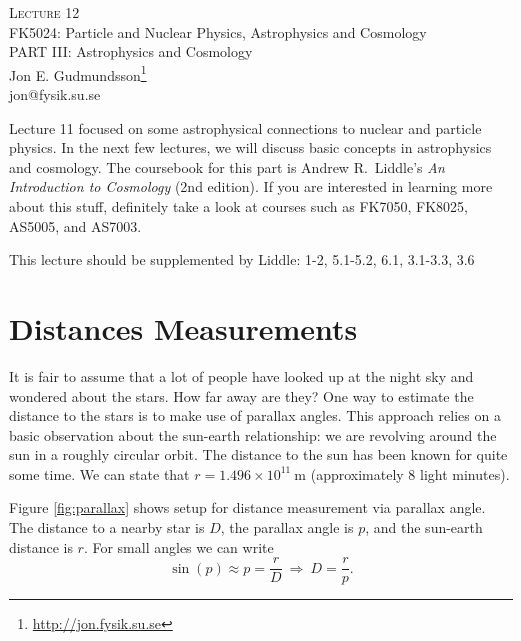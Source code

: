 \documentclass[a4paper,12pt]{article}
\theoremstyle{remark}
\newcommand{\mrm}[1]{\mathrm{#1}}
\renewcommand{\=}[1]{\stackrel{#1}{=}} %
\newcommand{\linkc}[1]{\textcolor{linkc}{#1}}
\theoremstyle{plain}
\theoremstyle{definition}
\begin{document}
\fontsize{5mm}{6mm}\selectfont\thispagestyle{empty}

\thispagestyle{empty}
\begin{center}
\textsc{Lecture 12}\\[1.5ex]
{\Huge FK5024: Particle and Nuclear Physics, Astrophysics and Cosmology\\}
\vspace{3mm}
{\large PART III: Astrophysics and Cosmology \\}
Jon E. Gudmundsson\footnote{\href{http://jon.fysik.su.se}{\linkc{http://jon.fysik.su.se}}} \\
\linkc{jon@fysik.su.se}
\end{center}

Lecture 11 focused on some astrophysical connections to nuclear and particle physics. In the next few lectures, we will discuss basic concepts in astrophysics and cosmology. The coursebook for this part is Andrew R.\ Liddle's \textit{An Introduction to Cosmology} (2nd edition). If you are interested in learning more about this stuff, definitely take a look at courses such as FK7050, FK8025, AS5005, and AS7003.

\begin{attention}
This lecture should be supplemented by Liddle: 1-2, 5.1-5.2, 6.1, 3.1-3.3, 3.6
\end{attention}

\section{Distances Measurements}
It is fair to assume that a lot of people have looked up at the night sky and wondered about the stars. How far away are they? One way to estimate the distance to the stars is to make use of parallax angles. This approach relies on a basic observation about the sun-earth relationship: we are revolving around the sun in a roughly circular orbit. The distance to the sun has been known for quite some time. We can state that $r = 1.496 \times 10^{11}\:\mrm{m}$ (approximately 8 light minutes).

Figure \ref{fig:parallax} shows setup for distance measurement via parallax angle. The distance to a nearby star is $D$, the parallax angle is $p$, and the sun-earth distance is $r$. For small angles we can write
\begin{equation}
\sin (p) \approx p = \frac{r}{D} \: \Rightarrow \: D = \frac{r}{p}.
\end{equation}
\end{document}
